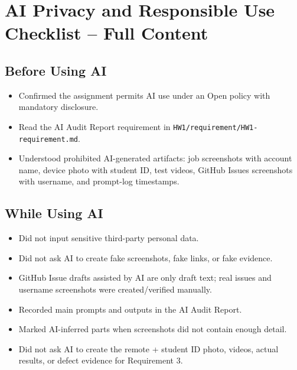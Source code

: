 \documentclass[12pt, a4paper]{article}
\begin{document}
\section{AI Privacy and Responsible Use Checklist -- Full Content}

\subsection{Before Using AI}

\begin{itemize}[leftmargin=*, itemsep=4pt]
  \item[$\checkmark$] Confirmed the assignment permits AI use under an Open policy with mandatory disclosure.
  \item[$\checkmark$] Read the AI Audit Report requirement in \texttt{HW1/requirement/HW1-requirement.md}.
  \item[$\checkmark$] Understood prohibited AI-generated artifacts: job screenshots with account name, device photo with student ID, test videos, GitHub Issues screenshots with username, and prompt-log timestamps.
\end{itemize}

\subsection{While Using AI}

\begin{itemize}[leftmargin=*, itemsep=4pt]
  \item[$\checkmark$] Did not input sensitive third-party personal data.
  \item[$\checkmark$] Did not ask AI to create fake screenshots, fake links, or fake evidence.
  \item[$\checkmark$] GitHub Issue drafts assisted by AI are only draft text; real issues and username screenshots were created/verified manually.
  \item[$\checkmark$] Recorded main prompts and outputs in the AI Audit Report.
  \item[$\checkmark$] Marked AI-inferred parts when screenshots did not contain enough detail.
  \item[$\checkmark$] Did not ask AI to create the remote + student ID photo, videos, actual results, or defect evidence for Requirement 3.
\end{itemize}
\end{document}
